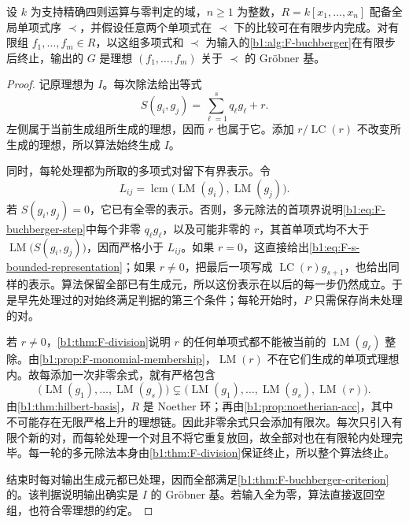 \begin{theorem}\label{b1:thm:F-buchberger-algorithm}
	设 \(k\) 为支持精确四则运算与零判定的域，\(n\geq1\) 为整数，\(R=k[x_1,\ldots,x_n]\) 配备全局单项式序 \(\prec\)，并假设任意两个单项式在 \(\prec\) 下的比较可在有限步内完成。对有限组 \(f_1,\ldots,f_m\in R\)，以这组多项式和 \(\prec\) 为输入的\cref{b1:alg:F-buchberger}在有限步后终止，输出的 \(G\) 是理想 \((f_1,\ldots,f_m)\) 关于 \(\prec\) 的 Gröbner 基。
\end{theorem}

\begin{proof}
	记原理想为 \(I\)。每次除法给出等式
	\begin{equation}\label{b1:eq:F-buchberger-step}
		S(g_i,g_j)=\sum_{\ell=1}^s q_\ell g_\ell+r.
	\end{equation}
	左侧属于当前生成组所生成的理想，因而 \(r\) 也属于它。添加 \(r/\operatorname{LC}(r)\) 不改变所生成的理想，所以算法始终生成 \(I\)。

	同时，每轮处理都为所取的多项式对留下有界表示。令
	\[
		L_{ij}=\operatorname{lcm}\bigl(\operatorname{LM}(g_i),\operatorname{LM}(g_j)\bigr).
	\]
	若 \(S(g_i,g_j)=0\)，它已有全零的表示。否则，多元除法的首项界说明\eqref{b1:eq:F-buchberger-step}中每个非零 \(q_\ell g_\ell\)，以及可能非零的 \(r\)，其首单项式均不大于 \(\operatorname{LM}\bigl(S(g_i,g_j)\bigr)\)，因而严格小于 \(L_{ij}\)。如果 \(r=0\)，这直接给出\eqref{b1:eq:F-s-bounded-representation}；如果 \(r\ne0\)，把最后一项写成 \(\operatorname{LC}(r)g_{s+1}\)，也给出同样的表示。算法保留全部已有生成元，所以这份表示在以后的每一步仍然成立。于是早先处理过的对始终满足判据的第三个条件；每轮开始时，\(P\) 只需保存尚未处理的对。

	若 \(r\ne0\)，\cref{b1:thm:F-division}说明 \(r\) 的任何单项式都不能被当前的 \(\operatorname{LM}(g_\ell)\) 整除。由\cref{b1:prop:F-monomial-membership}，\(\operatorname{LM}(r)\) 不在它们生成的单项式理想内。故每添加一次非零余式，就有严格包含
	\[
		\bigl(\operatorname{LM}(g_1),\ldots,\operatorname{LM}(g_s)\bigr) \subsetneq \bigl(\operatorname{LM}(g_1),\ldots,\operatorname{LM}(g_s), \operatorname{LM}(r)\bigr).
	\]
	由\cref{b1:thm:hilbert-basis}，\(R\) 是 Noether 环；再由\cref{b1:prop:noetherian-acc}，其中不可能存在无限严格上升的理想链。因此非零余式只会添加有限次。每次只引入有限个新的对，而每轮处理一个对且不将它重复放回，故全部对也在有限轮内处理完毕。每一轮的多元除法本身由\cref{b1:thm:F-division}保证终止，所以整个算法终止。

	结束时每对输出生成元都已处理，因而全部满足\cref{b1:thm:F-buchberger-criterion}的。该判据说明输出确实是 \(I\) 的 Gröbner 基。若输入全为零，算法直接返回空组，也符合零理想的约定。
\end{proof}

